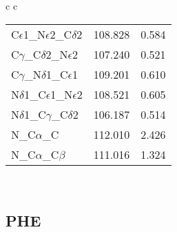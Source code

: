 \begin{longtable}{ c c }
\begin{tabular}{ l l l }
  C$\epsilon$1\_N$\epsilon$2\_C$\delta$2 & 108.828 & 0.584\\
  C$\gamma$\_C$\delta$2\_N$\epsilon$2 & 107.240 & 0.521\\
  C$\gamma$\_N$\delta$1\_C$\epsilon$1 & 109.201 & 0.610\\
  N$\delta$1\_C$\epsilon$1\_N$\epsilon$2 & 108.521 & 0.605\\
  N$\delta$1\_C$\gamma$\_C$\delta$2 & 106.187 & 0.514\\
  N\_C$\alpha$\_C & 112.010 & 2.426\\
  N\_C$\alpha$\_C$\beta$ & 111.016 & 1.324\\
  \bottomrule
  \end{tabular}
  \\
  
\end{longtable}    

\newpage
\subsection{PHE}

